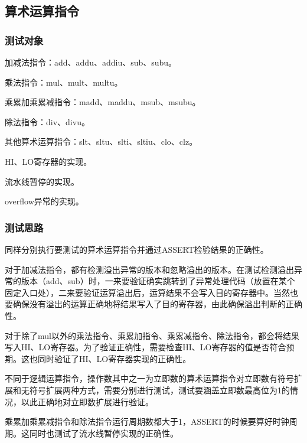 \documentclass[11pt,utf8]{article}
\begin{document}
{{{}
}

\subsection{算术运算指令} {
\subsubsection{测试对象} {
加减法指令：add、addu、addiu、sub、subu。

乘法指令：mul、mult、multu。

乘累加乘累减指令：madd、maddu、msub、msubu。

除法指令：div、divu。

其他算术运算指令：slt、sltu、slti、sltiu、clo、clz。

HI、LO寄存器的实现。

流水线暂停的实现。

overflow异常的实现。
}
\subsubsection{测试思路} {
同样分别执行要测试的算术运算指令并通过ASSERT检验结果的正确性。

对于加减法指令，都有检测溢出异常的版本和忽略溢出的版本。在测试检测溢出异常的版本（add、sub）时，一来要验证确实跳转到了异常处理代码（放置在某个固定入口处），二来要验证运算溢出后，运算结果不会写入目的寄存器中。当然也要确保没有溢出的运算正确地将结果写入了目的寄存器，由此确保溢出判断的正确性。

对于除了mul以外的乘法指令、乘累加指令、乘累减指令、除法指令，都会将结果写入HI、LO寄存器。为了验证正确性，需要检查HI、LO寄存器的值是否符合预期。这也同时验证了HI、LO寄存器实现的正确性。

不同于逻辑运算指令，操作数其中之一为立即数的算术运算指令对立即数有符号扩展和无符号扩展两种方式，需要分别进行测试，测试要涵盖立即数最高位为1的情况，以此正确地对立即数扩展进行验证。

乘累加乘累减指令和除法指令运行周期数都大于1，ASSERT的时候要算好时钟周期。这同时也测试了流水线暂停实现的正确性。
}
}}
\end{document}
